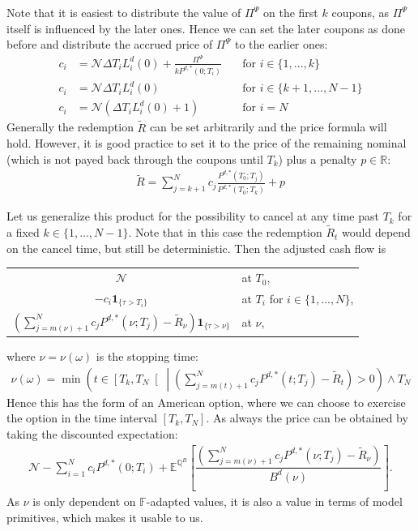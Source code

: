 \documentclass[12pt]{article}
\begin{document}
	Note that it is easiest to distribute the value of $\Pi^\Psi$ on the first $k$ coupons, as $\Pi^\Psi$ itself is influenced by the later ones.
	Hence we can set the later coupons as done before and distribute the accrued price of $\Pi^\Psi$ to the earlier ones: 
	\begin{align*}
		c_i &= \mathcal{N} \Delta T_i L^d_i(0) + \frac{\Pi^\Psi}{k P^{d,*}(0;T_i)} \quad &\text{for } i \in \{1,...,k\}\\
		c_i &= \mathcal{N} \Delta T_i L^d_i(0) \quad &\text{for } i \in \{k+1,..., N -1\}\\
		c_i &= \mathcal{N} \left(\Delta T_i L^d_i(0) + 1\right) \quad &\text{for } i = N
	\end{align*}
	Generally the redemption $\tilde{R}$ can be set arbitrarily and the price formula will hold. However, \color{red}it is good practice to \color{black} set it to the price of the remaining nominal (which is not payed back through the coupons until $T_k$) plus a penalty $p\in \mathbb{R}$:
	\begin{align*}
		\tilde{R} = \sum_{j=k+1}^{N}c_j \frac{P^{d,*}(T_0;T_j)}{P^{d,*}(T_0;T_k)} + p
	\end{align*}
	
	
	Let us generalize this product for the possibility to cancel at any time past $T_k$ for a fixed $k \in \{1,...,N-1\}$.
	Note that in this case the redemption $\tilde{R}_t$ would depend on the cancel time, but still be deterministic. Then the adjusted cash flow is
	
	\begin{center}
		\begin{tabular}{cl}
			$\mathcal{N}$ & at $T_0$, \\
			$-c_i\mathbf{1}_{\{\tau > T_i\}}$ 		  & at $T_i$ for $i \in \{1, ..., N\}$, \\
			$\left(\sum_{j=m(\nu)+1}^{N}c_jP^{d,*}(\nu;T_j) - \tilde{R}_\nu\right)\mathbf{1}_{\{\tau > \nu\}}$
			& at $\nu$,
		\end{tabular}
	\end{center}
	
	where $\nu = \nu(\omega)$ is the stopping time:
	\begin{align*}
		\nu(\omega) = \min\left(t\in \left[T_k,T_N\right[ \;\left| \;\left(\sum_{j=m(t)+1}^{N}c_jP^{d,*}(t;T_j) - \tilde{R}_t\right) > 0\right. \right) \wedge T_N
	\end{align*}
	Hence this has the form of an American option, where we can choose to exercise the option in the time interval $\left[T_k,T_N\right]$. As always the price can be obtained by taking the discounted expectation:	
	\begin{align*}
		\mathcal{N} -\sum_{i=1}^{N}c_iP^{d,*}(0;T_i) +  \mathbb{E}^{\mathbb{Q}^B}\left[\dfrac{\left(\sum_{j=m(\nu)+1}^{N}c_jP^{d,*}(\nu;T_j) - \tilde{R}_\nu\right)}{B^d(\nu)}\right].
	\end{align*}
	As $\nu$ is only dependent on $\mathbb{F}$-adapted values, it is also a value in terms of model primitives, which makes it usable to us.
	
\end{document}
